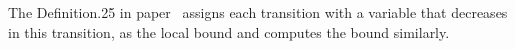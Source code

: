 The Definition.25 in paper~\cite{sinn2017complexity}
assigns each transition with a variable that decreases in this transition, as the local bound and computes the bound similarly.
% 
%
%
